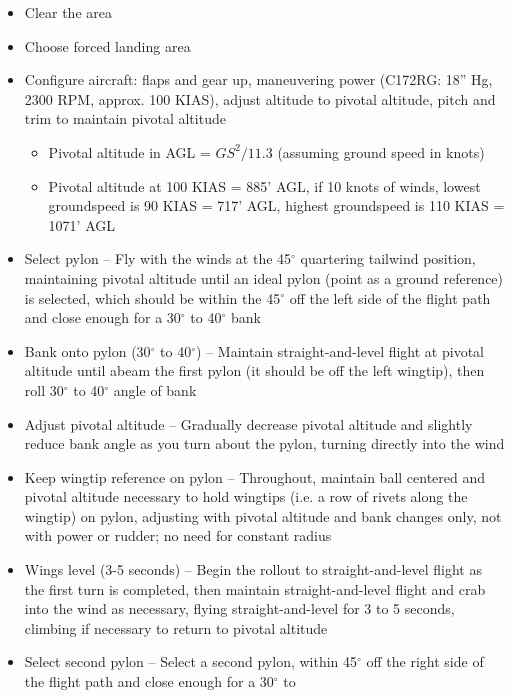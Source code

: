 \begin{itemize}
  \item Clear the area
  \item Choose forced landing area
  \item Configure aircraft: flaps and gear up, maneuvering power (C172RG: 18''
    Hg, 2300 RPM, approx. 100 KIAS), adjust altitude to pivotal altitude, pitch
    and trim to maintain pivotal altitude
    \begin{itemize}
      \item Pivotal altitude in AGL = $GS^2 / 11.3$ (assuming ground speed in
        knots)
      \item Pivotal altitude at 100 KIAS = 885' AGL, if 10 knots of winds,
        lowest groundspeed is 90 KIAS = 717' AGL, highest groundspeed is 110
        KIAS = 1071' AGL
    \end{itemize}
  \item Select pylon -- Fly with the winds at the 45$^\circ$ quartering
    tailwind position, maintaining pivotal altitude until an ideal pylon (point
    as a ground reference) is selected, which should be within the 45$^\circ$
    off the left side of the flight path and close enough for a 30$^\circ$ to
    40$^\circ$ bank
  \item Bank onto pylon (30$^\circ$ to 40$^\circ$) -- Maintain
    straight-and-level flight at pivotal altitude until abeam the first pylon
    (it should be off the left wingtip), then roll 30$^\circ$ to 40$^\circ$
    angle of bank
  \item Adjust pivotal altitude -- Gradually decrease pivotal altitude and
    slightly reduce bank angle as you turn about the pylon, turning directly
    into the wind
  \item Keep wingtip reference on pylon -- Throughout, maintain ball centered
    and pivotal altitude necessary to hold wingtips (i.e. a row of rivets along
    the wingtip) on pylon, adjusting with pivotal altitude and bank changes
    only, not with power or rudder; no need for constant radius
  \item Wings level (3-5 seconds) -- Begin the rollout to straight-and-level
    flight as the first turn is completed, then maintain straight-and-level
    flight and crab into the wind as necessary, flying straight-and-level for 3
    to 5 seconds, climbing if necessary to return to pivotal altitude
  \item Select second pylon -- Select a second pylon, within 45$^\circ$ off the
    right side of the flight path and close enough for a 30$^\circ$ to

\end{itemize}
